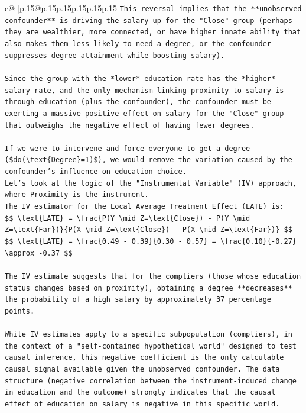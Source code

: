 \documentclass{article}
\begin{document}
{\begin{supertabular}{c@{$\;$}|p{.15\linewidth}@{}p{.15\linewidth}p{.15\linewidth}p{.15\linewidth}p{.15\linewidth}p{.15\linewidth}}
{{{\texttt{This reversal implies that the **unobserved confounder** is driving the salary up for the "Close" group (perhaps they are wealthier, more connected, or have higher innate ability that also makes them less likely to need a degree, or the confounder suppresses degree attainment while boosting salary).} \\
\\ 
\texttt{Since the group with the *lower* education rate has the *higher* salary rate, and the only mechanism linking proximity to salary is through education (plus the confounder), the confounder must be exerting a massive positive effect on salary for the "Close" group that outweighs the negative effect of having fewer degrees.} \\
\\ 
\texttt{If we were to intervene and force everyone to get a degree (\$do(\textbackslash{}text\{Degree\}=1)\$), we would remove the variation caused by the confounder's influence on education choice.} \\
\texttt{Let's look at the logic of the "Instrumental Variable" (IV) approach, where Proximity is the instrument.} \\
\texttt{The IV estimator for the Local Average Treatment Effect (LATE) is:} \\
\texttt{\$\$ \textbackslash{}text\{LATE\} = \textbackslash{}frac\{P(Y \textbackslash{}mid Z=\textbackslash{}text\{Close\}) {-} P(Y \textbackslash{}mid Z=\textbackslash{}text\{Far\})\}\{P(X \textbackslash{}mid Z=\textbackslash{}text\{Close\}) {-} P(X \textbackslash{}mid Z=\textbackslash{}text\{Far\})\} \$\$} \\
\texttt{\$\$ \textbackslash{}text\{LATE\} = \textbackslash{}frac\{0.49 {-} 0.39\}\{0.30 {-} 0.57\} = \textbackslash{}frac\{0.10\}\{{-}0.27\} \textbackslash{}approx {-}0.37 \$\$} \\
\\ 
\texttt{The IV estimate suggests that for the compliers (those whose education status changes based on proximity), obtaining a degree **decreases** the probability of a high salary by approximately 37 percentage points.} \\
\\ 
\texttt{While IV estimates apply to a specific subpopulation (compliers), in the context of a "self{-}contained hypothetical world" designed to test causal inference, this negative coefficient is the only calculable causal signal available given the unobserved confounder. The data structure (negative correlation between the instrument{-}induced change in education and the outcome) strongly indicates that the causal effect of education on salary is negative in this specific world.} \\
}}}
\end{supertabular}}
\end{document}
